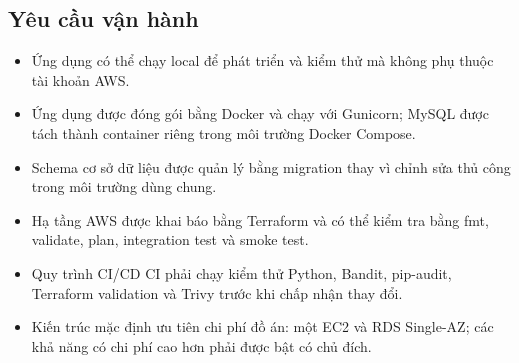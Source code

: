 \subsection{Yêu cầu vận hành}

\begin{itemize}
    \item Ứng dụng có thể chạy local để phát triển
    và kiểm thử mà không phụ thuộc tài khoản AWS.

    \item Ứng dụng được đóng gói bằng Docker và chạy
    với Gunicorn; MySQL được tách thành container riêng
    trong môi trường Docker Compose.

    \item Schema cơ sở dữ liệu được quản lý bằng
    migration thay vì chỉnh sửa thủ công trong
    môi trường dùng chung.

    \item Hạ tầng AWS được khai báo bằng Terraform
    và có thể kiểm tra bằng fmt, validate, plan,
    integration test và smoke test.

    \item Quy trình CI/CD CI phải chạy kiểm thử Python,
    Bandit, pip-audit, Terraform validation và Trivy
    trước khi chấp nhận thay đổi.

    \item Kiến trúc mặc định ưu tiên chi phí đồ án:
    một EC2 và RDS Single-AZ; các khả năng có chi phí
    cao hơn phải được bật có chủ đích.
\end{itemize}

